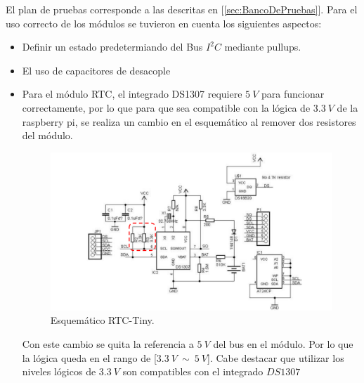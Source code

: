 El plan de pruebas corresponde a las descritas en [\ref{sec:BancoDePruebas}].
Para el uso correcto de los módulos se tuvieron en cuenta los siguientes aspectos:
\begin{itemize}
\item Definir un estado predetermiando del Bus $I^2C$ mediante pullups.
\item El uso de capacitores de desacople
\item Para el módulo RTC, el integrado DS1307 requiere $5 \ V$ para funcionar correctamente, por lo que para que sea compatible con la lógica de $3.3 \ V$ de la raspberry pi, se realiza un cambio en el esquemático al remover dos resistores del módulo.
\begin{figure}[H]
	\centering
	\includegraphics[width=0.9\linewidth,page=1]{ImagenesIngenieria de detalle/rtcTinySchematic}
	\caption{Esquemático RTC-Tiny.}
		\label{fig:RTCSchematic}
\end{figure}
Con este cambio se quita la referencia a $5 \ V$ del bus en el módulo. Por lo que la lógica queda en el rango de [$3.3 \ V \ \sim \ 5 \ V$].
Cabe destacar que utilizar los niveles lógicos de $3.3 \ V$ son compatibles con el integrado $DS1307$
\end{itemize}

